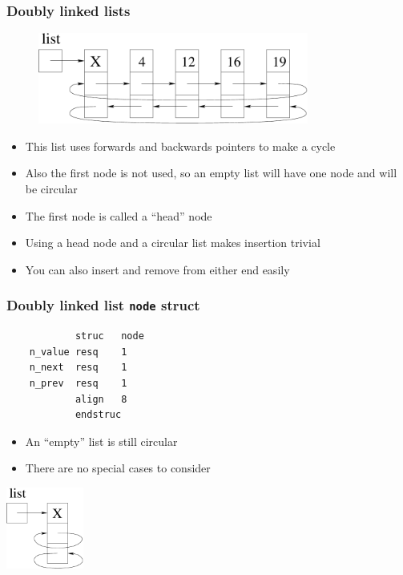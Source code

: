 \documentclass{beamer}
\begin{document}
\begin{frame}[fragile]
    \frametitle{Doubly linked lists}
\begin{figure}[h!]
\centering\includegraphics[width=3.5in]{doubly_linked_list.pdf}
\end{figure}
    \begin{itemize}
        \item This list uses forwards and backwards pointers to make a cycle
        \item Also the first node is not used, so an empty list
              will have one node and will be circular
        \item The first node is called a ``head'' node
        \item Using a head node and a circular list makes insertion trivial
        \item You can also insert and remove from either end easily
    \end{itemize}
\end{frame}


\begin{frame}[fragile]
    \frametitle{Doubly linked list {\tt node} struct}
\begin{verbatim}
            struc   node
    n_value resq    1
    n_next  resq    1
    n_prev  resq    1
            align   8
            endstruc
\end{verbatim}
    \begin{itemize}
        \item An ``empty'' list is still circular
        \item There are no special cases to consider
    \end{itemize}
\begin{center}
\includegraphics[width=1.0in]{empty_doubly_linked_list.pdf}
\end{center}
\end{frame}
\end{document}

